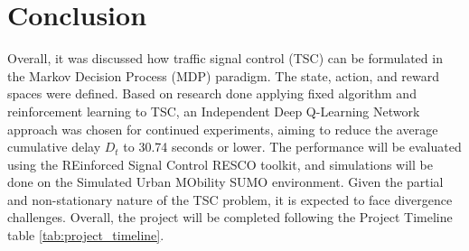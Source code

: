 \documentclass[letterpaper]{article} %
\begin{document}
\section{Conclusion}
Overall, it was discussed how traffic signal control (TSC) can be formulated in the Markov Decision Process (MDP) paradigm. The state, action, and reward spaces were defined.
Based on research done applying fixed algorithm and reinforcement learning to TSC, an Independent Deep Q-Learning Network approach was chosen for continued experiments, aiming to reduce the average cumulative delay \(D_t\) to 30.74 seconds or lower.
The performance will be evaluated using the REinforced Signal Control RESCO toolkit, and simulations will be done on the Simulated Urban MObility SUMO environment.
Given the partial and non-stationary nature of the TSC problem, it is expected to face divergence challenges. Overall, the project will be completed following the Project Timeline table \ref{tab:project_timeline}.




\end{document}
